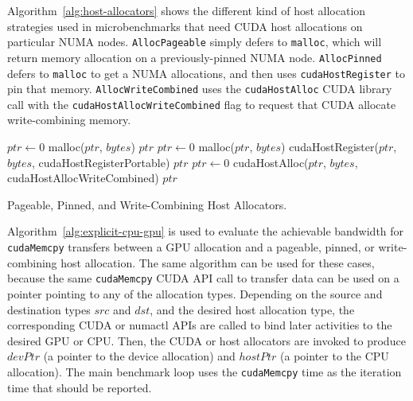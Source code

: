 Algorithm~\ref{alg:host-allocators} shows the different kind of host allocation strategies used in microbenchmarks that need CUDA host allocations on particular NUMA nodes.
\texttt{AllocPageable} simply defers to \texttt{malloc}, which will return memory allocation on a previously-pinned NUMA node.
\texttt{AllocPinned} defers to \texttt{malloc} to get a NUMA allocations, and then uses \texttt{cudaHostRegister} to pin that memory.
\texttt{AllocWriteCombined} uses the \texttt{cudaHostAlloc} CUDA library call with the \texttt{cudaHostAllocWriteCombined} flag to request that CUDA allocate write-combining memory.

\begin{algorithm}[H]
	\begin{algorithmic}[1]
		\Statex
		\State $ptr \gets 0$
		\State malloc($ptr$, $bytes$)
		\Return $ptr$
		\EndFunction
		\Statex
		\State $ptr \gets 0$
		\State malloc($ptr$, $bytes$)
		\State cudaHostRegister($ptr$, $bytes$, cudaHostRegisterPortable)
		\Return $ptr$
		\EndFunction
		\Statex
		\State $ptr \gets 0$
		\State cudaHostAlloc($ptr$, $bytes$, cudaHostAllocWriteCombined)
		\Return $ptr$
		\EndFunction
		
	\end{algorithmic}
	\caption[Pageable, Pinned, and Write-Combining Host Allocators.]{
        Pageable, Pinned, and Write-Combining Host Allocators.
	}
	\label{alg:host-allocators}
\end{algorithm}

Algorithm~\ref{alg:explicit-cpu-gpu} is used to evaluate the achievable bandwidth for \texttt{cudaMemcpy} transfers between a GPU allocation and a pageable, pinned, or write-combining host allocation. 
The same algorithm can be used for these cases, because the same \texttt{cudaMemcpy} CUDA API call to transfer data can be used on a pointer pointing to any of the allocation types.
Depending on the source and destination types $src$ and $dst$, and the desired host allocation type, the corresponding CUDA or numactl APIs are called to bind later activities to the desired GPU or CPU.
Then, the CUDA or host allocators are invoked to produce $devPtr$ (a pointer to the device allocation) and $hostPtr$ (a pointer to the CPU allocation).
The main benchmark loop uses the \texttt{cudaMemcpy} time as the iteration time that should be reported.

